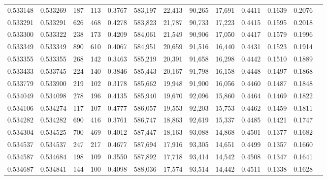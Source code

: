 \begin{tabular}{rrrrrrrrrrrrr}
0.533148 & 0.533269 &   187 &   113 &                                     0.3767 & 583,197 &  22,413 &  90,265 &  17,691 & 0.4411 & 0.1639 & 0.2076 \\
0.533291 & 0.533291 &   626 &   468 &                                     0.4278 & 583,823 &  21,787 &  90,733 &  17,223 & 0.4415 & 0.1595 & 0.2018 \\
0.533300 & 0.533322 &   238 &   173 &                                     0.4209 & 584,061 &  21,549 &  90,906 &  17,050 & 0.4417 & 0.1579 & 0.1996 \\
0.533349 & 0.533349 &   890 &   610 &                                     0.4067 & 584,951 &  20,659 &  91,516 &  16,440 & 0.4431 & 0.1523 & 0.1914 \\
0.533355 & 0.533355 &   268 &   142 &                                     0.3463 & 585,219 &  20,391 &  91,658 &  16,298 & 0.4442 & 0.1510 & 0.1889 \\
0.533433 & 0.533745 &   224 &   140 &                                     0.3846 & 585,443 &  20,167 &  91,798 &  16,158 & 0.4448 & 0.1497 & 0.1868 \\
0.533779 & 0.533900 &   219 &   102 &                                     0.3178 & 585,662 &  19,948 &  91,900 &  16,056 & 0.4460 & 0.1487 & 0.1848 \\
0.534049 & 0.534098 &   278 &   196 &                                     0.4135 & 585,940 &  19,670 &  92,096 &  15,860 & 0.4464 & 0.1469 & 0.1822 \\
0.534106 & 0.534274 &   117 &   107 &                                     0.4777 & 586,057 &  19,553 &  92,203 &  15,753 & 0.4462 & 0.1459 & 0.1811 \\
0.534282 & 0.534282 &   690 &   416 &                                     0.3761 & 586,747 &  18,863 &  92,619 &  15,337 & 0.4485 & 0.1421 & 0.1747 \\
0.534304 & 0.534525 &   700 &   469 &                                     0.4012 & 587,447 &  18,163 &  93,088 &  14,868 & 0.4501 & 0.1377 & 0.1682 \\
0.534537 & 0.534537 &   247 &   217 &                                     0.4677 & 587,694 &  17,916 &  93,305 &  14,651 & 0.4499 & 0.1357 & 0.1660 \\
0.534587 & 0.534684 &   198 &   109 &                                     0.3550 & 587,892 &  17,718 &  93,414 &  14,542 & 0.4508 & 0.1347 & 0.1641 \\
0.534687 & 0.534841 &   144 &   100 &                                     0.4098 & 588,036 &  17,574 &  93,514 &  14,442 & 0.4511 & 0.1338 & 0.1628 \\

\end{tabular}
